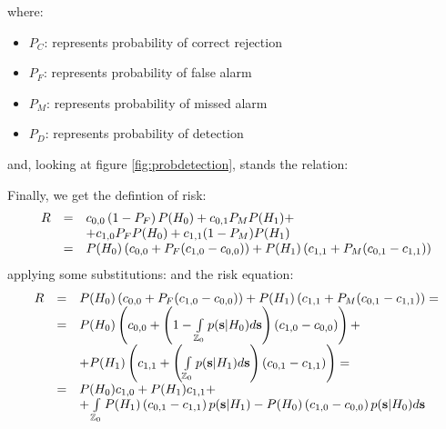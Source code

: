 where:
\begin{itemize}
\item $P_C$: represents probability of correct rejection
\item $P_F$: represents probability of false alarm
\item $P_M$: represents probability of missed alarm
\item $P_D$: represents probability of detection
\end{itemize}
and, looking at figure \ref{fig:probdetection}, stands the relation:

Finally, we get the defintion of risk:
\begin{equation}
\begin{array}{rcl} 
R & = & c_{0,0} \left( 1-P_F \right) P(H_0) + c_{0,1} P_M P(H_1) + \\ 
  &   &  + c_{1,0} P_F P(H_0) + c_{1,1} (1-P_M) P(H_1) \\
  & = & P(H_0) \left( c_{0,0} + P_F (c_{1,0} - c_{0,0}) \right) + P(H_1) \left( c_{1,1} + P_M (c_{0,1} - c_{1,1}) \right)
\end{array}
\end{equation}
applying some substitutions:
and the risk equation:
\begin{equation}
\begin{array}{rcl}
R & = & P(H_0) \left( c_{0,0} + P_F (c_{1,0} - c_{0,0}) \right) + P(H_1) \left( c_{1,1} + P_M (c_{0,1} - c_{1,1}) \right) = \\ 
  & = & P(H_0) \left( c_{0,0} + \left( 1 - \int\limits_{\mathbb{Z}_0}p(\mathbf{s}|H_0)d\mathbf{s} \right) (c_{1,0} - c_{0,0}) \right) + \\ 
  &   &  + P(H_1) \left( c_{1,1} + \left( \int\limits_{\mathbb{Z}_0}p(\mathbf{s}|H_1)d\mathbf{s} \right) (c_{0,1} - c_{1,1}) \right) = \\ 
  & = & P(H_0) c_{1,0} + P(H_1) c_{1,1} + \\
  &   & + \int\limits_{\mathbb{Z}_0} P(H_1)\left( c_{0,1} - c_{1,1} \right) p(\mathbf{s}|H_1) - P(H_0)\left( c_{1,0} - c_{0,0} \right) p(\mathbf{s}|H_0) d\mathbf{s}
\end{array}
\end{equation}
